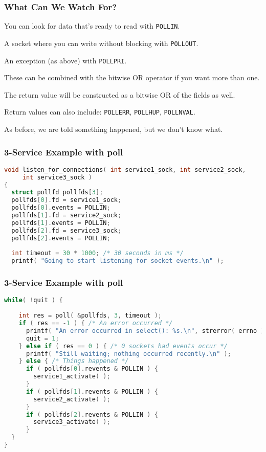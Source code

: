 \begin{frame}
	\frametitle{What Can We Watch For?}

	You can look for data that's ready to read with \texttt{POLLIN}.

	A socket where you can write without blocking with \texttt{POLLOUT}.

	An exception (as above) with \texttt{POLLPRI}.

	These can be combined with the bitwise OR operator if you want more than one.

	The return value will be constructed as a bitwise OR of the fields as well.

	Return values can also include: \texttt{POLLERR}, \texttt{POLLHUP}, \texttt{POLLNVAL}.

	As before, we are told something happened, but we don't know what.

\end{frame}


\begin{frame}[fragile]
	\frametitle{3-Service Example with poll}
	\begin{lstlisting}[language=C]
void listen_for_connections( int service1_sock, int service2_sock,
     int service3_sock ) 
{
  struct pollfd pollfds[3];
  pollfds[0].fd = service1_sock;
  pollfds[0].events = POLLIN;
  pollfds[1].fd = service2_sock;
  pollfds[1].events = POLLIN;
  pollfds[2].fd = service3_sock;
  pollfds[2].events = POLLIN;
 
  int timeout = 30 * 1000; /* 30 seconds in ms */ 
  printf( "Going to start listening for socket events.\n" );
\end{lstlisting}

\end{frame}

\begin{frame}[fragile]
	\frametitle{3-Service Example with poll}
	\begin{lstlisting}[language=C]
  while( !quit ) {
    
    int res = poll( &pollfds, 3, timeout );
    if ( res == -1 ) { /* An error occurred */
      printf( "An error occurred in select(): %s.\n", strerror( errno ) );
      quit = 1;
    } else if ( res == 0 ) { /* 0 sockets had events occur */
      printf( "Still waiting; nothing occurred recently.\n" );
    } else { /* Things happened */
      if ( pollfds[0].revents & POLLIN ) {
        service1_activate( ); 
      }
      if ( pollfds[1].revents & POLLIN ) {
        service2_activate( ); 
      }
      if ( pollfds[2].revents & POLLIN ) {
        service3_activate( ); 
      }
  }
}
\end{lstlisting}

\end{frame}


